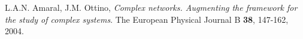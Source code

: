 \cleardoublepage
{}
{}
\begin{thebibliography}{99}

	L.A.N. Amaral, J.M. Ottino,
	\emph{Complex networks. Augmenting the framework for the study of complex systems}.
	The European Physical Journal B \textbf{38}, 147-162,
	2004.

\end{thebibliography}